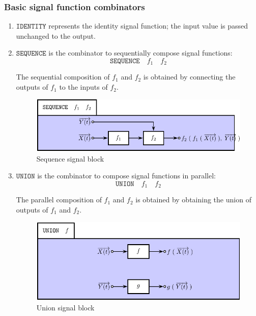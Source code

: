 \documentclass[a4paper]{article}
\begin{document}
\subsubsection{Basic signal function combinators}
\begin{enumerate}

\item $\texttt{IDENTITY}$ represents the identity signal function; the
  input value is passed unchanged to the output.

\item $\texttt{SEQUENCE}$ is the combinator to sequentially compose
  signal functions: \[\texttt{SEQUENCE}\quad{}f_{1}\quad{}f_{2}\]

The sequential composition of $f_{1}$ and $f_{2}$ is obtained by
connecting the outputs of $f_{1}$ to the inputs of $f_{2}$.

\begin{figure}
\includegraphics{figures/SequenceSignalBlock}
\caption{\label{Fig:SequenceSignalBlock}Sequence signal block}
\end{figure}

\item $\texttt{UNION}$ is the combinator to compose
  signal functions in parallel: \[\texttt{UNION}\quad{}f_{1}\quad{}f_{2}\]

The parallel composition of $f_{1}$ and $f_{2}$ is obtained by
obtaining the union of outputs of $f_{1}$ and $f_{2}$.

\begin{figure}
\includegraphics{figures/UnionSignalBlock}
\caption{\label{Fig:UnionSignalBlock}Union signal block}
\end{figure}


\end{enumerate}
\end{document}
